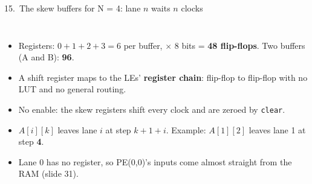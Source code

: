 \documentclass[aspectratio=169,11pt]{beamer}
\newcommand{\sig}[1]{\texttt{#1}}
\begin{document}
\begin{frame}{15.\ The skew buffers for N = 4: lane $n$ waits $n$ clocks}
  \begin{columns}[T]
    \centering
    \small
    \begin{itemize}
      \item Registers: $0 + 1 + 2 + 3 = 6$ per buffer, $\times$ 8 bits = \textbf{48 flip-flops}. Two buffers (A and B):
            \textbf{96}.
      \item A shift register maps to the LEs' \textbf{register chain}: flip-flop to flip-flop with no LUT and no
            general routing.
      \item No enable: the skew registers shift every clock and are zeroed by \sig{clear}.
      \item $A[i][k]$ leaves lane $i$ at step $k + 1 + i$. Example: $A[1][2]$ leaves lane 1 at step \textbf{4}.
      \item Lane 0 has no register, so PE(0,0)'s inputs come almost straight from the RAM (slide 31).
    \end{itemize}
  \end{columns}
\end{frame}

\end{document}
